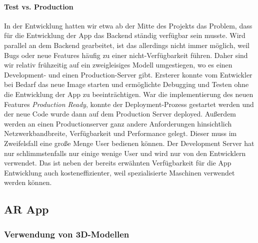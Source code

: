 \documentclass[titlepage, a4paper, 11pt]{scrartcl}
\begin{document}
        \paragraph{Test vs. Production}

          In der Entwicklung hatten wir etwa ab der Mitte des Projekts das Problem, dass für die Entwicklung der App das Backend ständig verfügbar sein musste.
          Wird parallel an dem Backend gearbeitet, ist das allerdings nicht immer möglich, weil Bugs oder neue Features häufig zu einer nicht-Verfügbarkeit führen.
          Daher sind wir relativ frühzeitig auf ein zweigleisiges Modell umgestiegen, wo es einen Development- und einen Production-Server gibt. 
          Ersterer konnte vom Entwickler bei Bedarf das neue Image starten und ermöglichte Debugging und Testen ohne die Entwicklung der App zu beeinträchtigen.
          War die implementierung des neuen Features \textit{Production Ready}, konnte der Deployment-Prozess gestartet werden und der neue Code wurde dann auf dem Production
          Server deployed. Außerdem werden an einen Productionserver ganz andere Anforderungen hinsichtlich Netzwerkbandbreite, Verfügbarkeit und Performance gelegt.
          Dieser muss im Zweifelsfall eine große Menge User bedienen können. Der Development Server hat nur schlimmstenfalls nur einige wenige User und wird nur von den Entwicklern verwendet.
          Das ist neben der bereits erwähnten Verfügbarkeit für die App Entwicklung auch kosteneffizienter, weil spezialisierte Maschinen verwendet werden können.

    \subsection{AR App}

    \subsubsection{Verwendung von 3D-Modellen}\label{3DModels}
    
\end{document}
